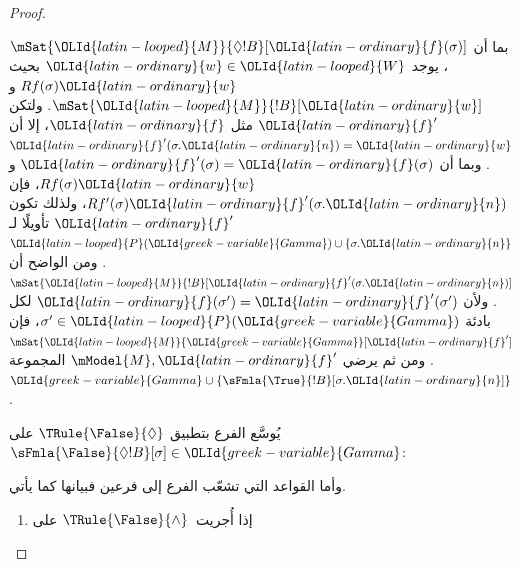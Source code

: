 \documentclass[../../../include/open-logic-section]{subfiles}
\begin{document}
\begin{proof}
\begin{enumerate}
{{  بما أن $\mSat{\OLId{latin-looped}{M}}{\Diamond !B}[\OLId{latin-ordinary}{f}(\sigma)]$، يوجد $\OLId{latin-ordinary}{w} \in \OLId{latin-looped}{W}$ بحيث
  $Rf(\sigma)\OLId{latin-ordinary}{w}$ و$\mSat{\OLId{latin-looped}{M}}{!B}[\OLId{latin-ordinary}{w}]$. ولتكن $\OLId{latin-ordinary}{f}'$ مثل $\OLId{latin-ordinary}{f}$، إلا أن
  $\OLId{latin-ordinary}{f}'(\sigma.\OLId{latin-ordinary}{n}) = \OLId{latin-ordinary}{w}$. وبما أن $\OLId{latin-ordinary}{f}'(\sigma) = \OLId{latin-ordinary}{f}(\sigma)$ و
  $Rf(\sigma)\OLId{latin-ordinary}{w}$، فإن $Rf'(\sigma)\OLId{latin-ordinary}{f}'(\sigma.\OLId{latin-ordinary}{n})$، ولذلك تكون $\OLId{latin-ordinary}{f}'$
  تأويلًا لـ$\OLId{latin-looped}{P}(\OLId{greek-variable}{Gamma}) \cup \{\sigma.\OLId{latin-ordinary}{n}\}$. ومن الواضح أن
  $\mSat{\OLId{latin-looped}{M}}{!B}[\OLId{latin-ordinary}{f}'(\sigma.\OLId{latin-ordinary}{n})]$. ولأن $\OLId{latin-ordinary}{f}(\sigma') = \OLId{latin-ordinary}{f}'(\sigma')$ لكل
  بادئة $\sigma' \in \OLId{latin-looped}{P}(\OLId{greek-variable}{Gamma})$، فإن $\mSat{\OLId{latin-looped}{M}}{\OLId{greek-variable}{Gamma}}[\OLId{latin-ordinary}{f}']$. ومن ثم
  يرضي $\mModel{M}, \OLId{latin-ordinary}{f}'$ المجموعة $\OLId{greek-variable}{Gamma} \cup
  \{\sFmla{\True}{!B}[\sigma.\OLId{latin-ordinary}{n}]\}$.}
\item يُوسَّع الفرع بتطبيق $\TRule{\False}{\Diamond}$ على
  $\sFmla{\False}{\Diamond !B}[\sigma] \in \OLId{greek-variable}{Gamma}$:
  }{}
\end{enumerate}
وأما القواعد التي تشعّب الفرع إلى فرعين فبيانها كما يأتي.
\begin{enumerate}
\item إذا أُجريت~$\TRule{\False}{\land}$ على

\end{enumerate}
\end{proof}
\end{document}
